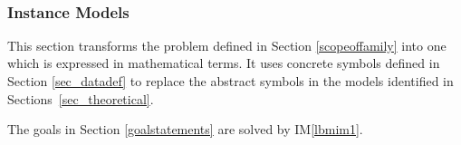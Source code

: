 \documentclass[12pt]{article}
\begin{document}
~\newpage

\subsubsection{Instance Models} \label{sec_instance}    

This section transforms the problem defined in Section \ref{scopeoffamily} into 
one which is expressed in mathematical terms. It uses concrete symbols defined 
in Section \ref{sec_datadef} to replace the abstract symbols in the models 
identified in Sections~\ref{sec_theoretical}.

The goals in Section \ref{goalstatements} are solved by IM\ref{lbmim1}.

~\newline

\end{document}
